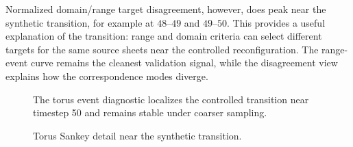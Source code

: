 Normalized domain/range target disagreement, however, does peak near the
synthetic transition, for example at \(48\)--\(49\) and \(49\)--\(50\). This
provides a useful explanation of the transition: range and domain criteria can
select different targets for the same source sheets near the controlled
reconfiguration. The range-event curve remains the cleanest validation signal,
while the disagreement view explains how the correspondence modes diverge.

\begin{figure}[t]
  \centering
  \caption{The torus event diagnostic localizes the controlled transition near
  timestep 50 and remains stable under coarser sampling.}
  \label{fig:torus-event-validation}
\end{figure}

\begin{figure}[t]
  \centering
  \caption{Torus Sankey detail near the synthetic transition.}
  \label{fig:torus-sankey-detail}
\end{figure}
